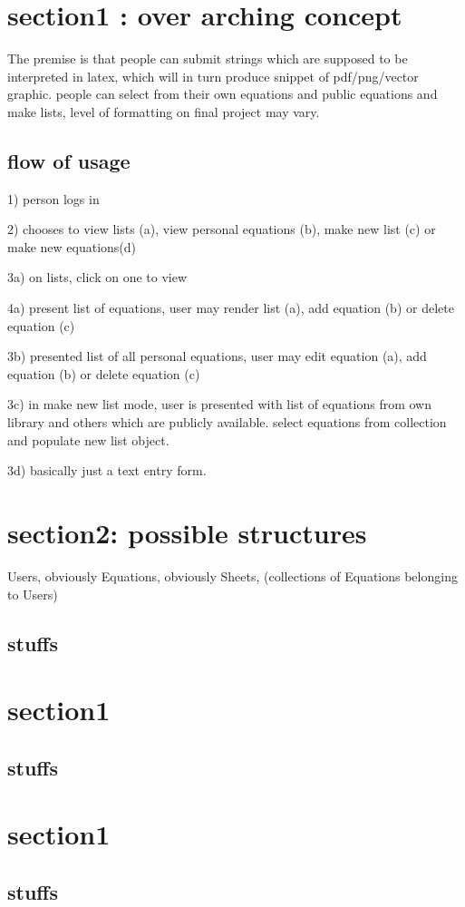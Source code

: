 \documentclass[12pt]{article}
\begin{document}
\section{section1 : over arching concept}%
The premise is that people can submit strings which are supposed to be interpreted in latex, which will in turn produce snippet of pdf/png/vector graphic. people can select from their own equations and public equations and make lists, level of formatting on final project may vary.

\subsection{flow of usage}
1) person logs in

2) chooses to view lists (a), view personal equations (b), make new list (c) or make new equations(d)

3a) on lists, click on one to view

4a) present list of equations, user may render list (a), add equation (b) or delete equation (c)

3b) presented list of all personal equations, user may edit equation (a), add equation (b) or delete equation (c)

3c) in make new list mode, user is presented with list of equations from own library and others which are publicly available. select equations from collection and populate new list object.

3d) basically just a text entry form.


\section{section2: possible structures }%
Users, obviously
Equations, obviously
Sheets, (collections of Equations belonging to Users)

\subsection{stuffs}

\section{section1 }%
\subsection{stuffs}

\section{section1 }%
\subsection{stuffs}
\end{document}
